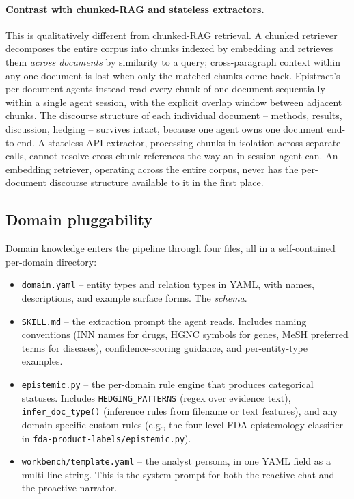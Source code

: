 \paragraph{Contrast with chunked-RAG and stateless extractors.} This is qualitatively different from chunked-RAG retrieval. A chunked retriever decomposes the entire corpus into chunks indexed by embedding and retrieves them \emph{across documents} by similarity to a query; cross-paragraph context within any one document is lost when only the matched chunks come back. Epistract's per-document agents instead read every chunk of one document sequentially within a single agent session, with the explicit overlap window between adjacent chunks. The discourse structure of each individual document -- methods, results, discussion, hedging -- survives intact, because one agent owns one document end-to-end. A stateless API extractor, processing chunks in isolation across separate calls, cannot resolve cross-chunk references the way an in-session agent can. An embedding retriever, operating across the entire corpus, never has the per-document discourse structure available to it in the first place.

\subsection{Domain pluggability}

Domain knowledge enters the pipeline through four files, all in a self-contained per-domain directory:

\begin{itemize}
\item \texttt{domain.yaml} -- entity types and relation types in YAML, with names, descriptions, and example surface forms. The \emph{schema}.
\item \texttt{SKILL.md} -- the extraction prompt the agent reads. Includes naming conventions (INN names for drugs, HGNC symbols for genes, MeSH preferred terms for diseases), confidence-scoring guidance, and per-entity-type examples.
\item \texttt{epistemic.py} -- the per-domain rule engine that produces categorical statuses. Includes \texttt{HEDGING\_PATTERNS} (regex over evidence text), \texttt{infer\_doc\_type()} (inference rules from filename or text features), and any domain-specific custom rules (e.g., the four-level FDA epistemology classifier in \texttt{fda-product-labels/epistemic.py}).
\item \texttt{workbench/template.yaml} -- the analyst persona, in one YAML field as a multi-line string. This is the system prompt for both the reactive chat and the proactive narrator.
\end{itemize}

